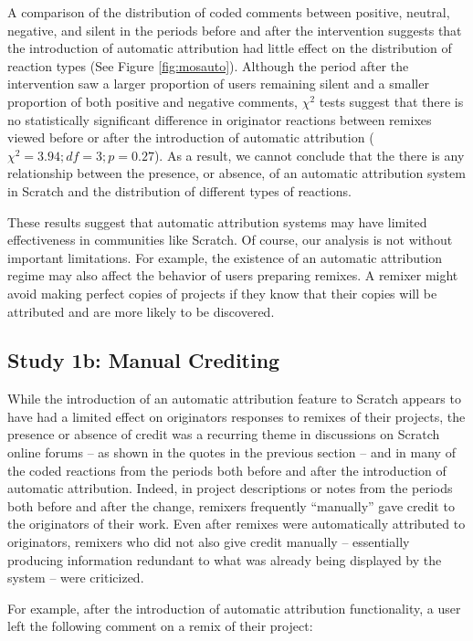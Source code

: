 A comparison of the distribution of coded comments between positive,
neutral, negative, and silent in the periods before and after the
intervention suggests that the introduction of automatic attribution
had little effect on the distribution of reaction types (See Figure
\ref{fig:mosauto}). Although the period after the intervention saw a
larger proportion of users remaining silent and a smaller proportion
of both positive and negative comments, $\chi^2$ tests suggest that
there is no statistically significant difference in originator
reactions between remixes viewed before or after the introduction of
automatic attribution ($\chi^2 = 3.94; df=3; p=0.27$). As a result, we
cannot conclude that the there is any relationship between the
presence, or absence, of an automatic attribution system in Scratch
and the distribution of different types of reactions.

These results suggest that automatic attribution systems may have
limited effectiveness in communities like Scratch. Of course, our
analysis is not without important limitations. For example, the
existence of an automatic attribution regime may also affect the
behavior of users preparing remixes. A remixer might avoid making
perfect copies of projects if they know that their copies will be
attributed and are more likely to be discovered.

\subsection{Study 1b: Manual Crediting}

While the introduction of an automatic attribution feature to Scratch
appears to have had a limited effect on originators responses to
remixes of their projects, the presence or absence of credit was a
recurring theme in discussions on Scratch online forums -- as shown in
the quotes in the previous section -- and in many of the coded
reactions from the periods both before and after the introduction of
automatic attribution. Indeed, in project descriptions or notes from
the periods both before and after the change, remixers frequently
``manually'' gave credit to the originators of their
work. Even after remixes were automatically attributed to originators,
remixers who did not also give credit manually -- essentially
producing information redundant to what was already being displayed by
the system -- were criticized.

For example, after the introduction of automatic attribution
functionality, a user left the following comment on a remix of their
project:

